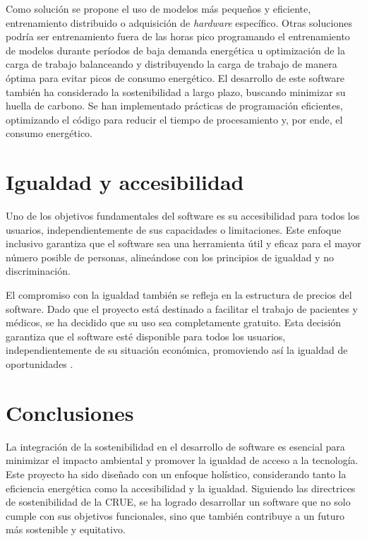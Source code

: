 Como solución se propone el uso de modelos más pequeños y eficiente, entrenamiento distribuido o adquisición de \textit{hardware} específico. Otras soluciones podría ser entrenamiento fuera de las horas pico programando el entrenamiento de modelos durante períodos de baja demanda energética u optimización de la carga de trabajo balanceando y distribuyendo la carga de trabajo de manera óptima para evitar picos de consumo energético.
El desarrollo de este software también ha considerado la sostenibilidad a largo plazo, buscando minimizar su huella de carbono. Se han implementado prácticas de programación eficientes, optimizando el código para reducir el tiempo de procesamiento y, por ende, el consumo energético.

\section{Igualdad y accesibilidad}
Uno de los objetivos fundamentales del software es su accesibilidad para todos los usuarios, independientemente de sus capacidades o limitaciones. Este enfoque inclusivo garantiza que el software sea una herramienta útil y eficaz para el mayor número posible de personas, alineándose con los principios de igualdad y no discriminación.

El compromiso con la igualdad también se refleja en la estructura de precios del software. Dado que el proyecto está destinado a facilitar el trabajo de pacientes y médicos, se ha decidido que su uso sea completamente gratuito. Esta decisión garantiza que el software esté disponible para todos los usuarios, independientemente de su situación económica, promoviendo así la igualdad de oportunidades .

\section{Conclusiones}
La integración de la sostenibilidad en el desarrollo de software es esencial para minimizar el impacto ambiental y promover la igualdad de acceso a la tecnología. Este proyecto ha sido diseñado con un enfoque holístico, considerando tanto la eficiencia energética como la accesibilidad y la igualdad. Siguiendo las directrices de sostenibilidad de la CRUE, se ha logrado desarrollar un software que no solo cumple con sus objetivos funcionales, sino que también contribuye a un futuro más sostenible y equitativo.





